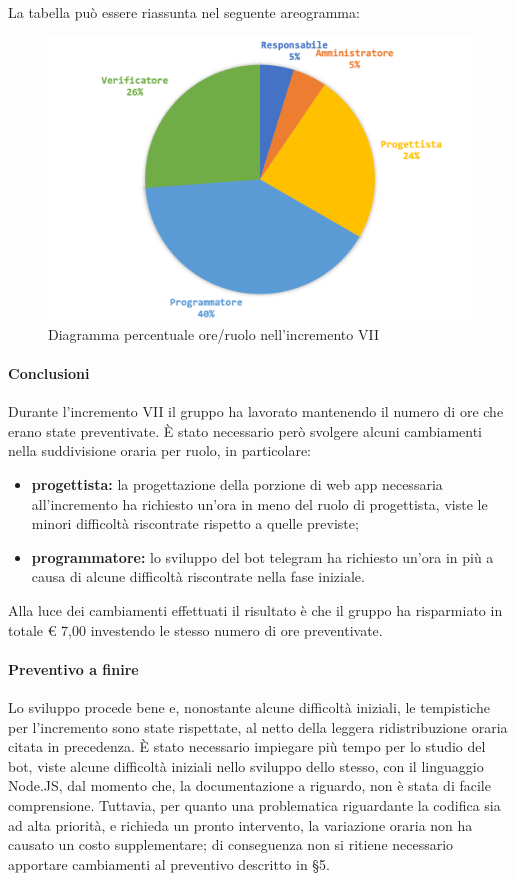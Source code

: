 		
		La tabella può essere riassunta nel seguente areogramma:
		\begin{figure}[H]
			\centering
			\includegraphics[width=0.8\linewidth]{images/consuntivo/ConsIncr7-2.png}
			\caption{Diagramma percentuale ore/ruolo nell'incremento VII}
			\label{fig:consuntivo diagramma costi ruolo incremento VII}
		\end{figure}
		\pagebreak
		
		\paragraph{Conclusioni}
			Durante l'incremento VII il gruppo ha lavorato mantenendo il numero di ore che erano state preventivate. È stato necessario però svolgere alcuni cambiamenti nella suddivisione oraria per ruolo, in particolare:
		\begin{itemize}
			\item \textbf{progettista:} la progettazione della porzione di web app necessaria all'incremento ha richiesto un'ora in meno del ruolo di progettista, viste le minori difficoltà riscontrate rispetto a quelle previste;
			\item \textbf{programmatore:} lo sviluppo del bot telegram ha richiesto un'ora in più a causa di alcune difficoltà riscontrate nella fase iniziale.
		\end{itemize}
			Alla luce dei cambiamenti effettuati il risultato è che il gruppo ha risparmiato in totale € 7,00 investendo le stesso numero di ore preventivate.
		
		\paragraph{Preventivo a finire}
			Lo sviluppo procede bene e, nonostante alcune difficoltà iniziali, le tempistiche per l'incremento sono state rispettate, al netto della leggera ridistribuzione oraria citata in precedenza.
			\newline
			È stato necessario impiegare più tempo per lo studio del bot, viste alcune difficoltà iniziali nello sviluppo dello stesso, con il linguaggio Node.JS, dal momento che, la documentazione a riguardo, non è stata di facile comprensione.
			\newline
			Tuttavia, per quanto una problematica riguardante la codifica sia ad alta priorità, e richieda un pronto intervento, la variazione oraria non ha causato un costo supplementare; di conseguenza non si ritiene necessario apportare cambiamenti al preventivo descritto in \S5.
		
